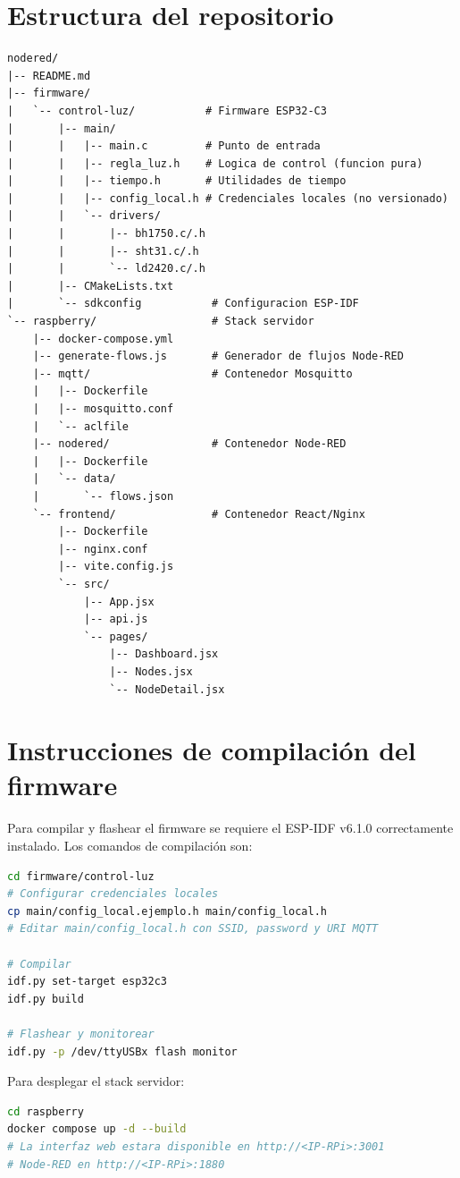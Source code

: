 \section{Estructura del repositorio}
\label{anx:estructura}

\begin{lstlisting}[caption={Estructura de directorios del proyecto NodeAlert IoT.}, label={lst:estructura}]
nodered/
|-- README.md
|-- firmware/
|   `-- control-luz/           # Firmware ESP32-C3
|       |-- main/
|       |   |-- main.c         # Punto de entrada
|       |   |-- regla_luz.h    # Logica de control (funcion pura)
|       |   |-- tiempo.h       # Utilidades de tiempo
|       |   |-- config_local.h # Credenciales locales (no versionado)
|       |   `-- drivers/
|       |       |-- bh1750.c/.h
|       |       |-- sht31.c/.h
|       |       `-- ld2420.c/.h
|       |-- CMakeLists.txt
|       `-- sdkconfig           # Configuracion ESP-IDF
`-- raspberry/                  # Stack servidor
    |-- docker-compose.yml
    |-- generate-flows.js       # Generador de flujos Node-RED
    |-- mqtt/                   # Contenedor Mosquitto
    |   |-- Dockerfile
    |   |-- mosquitto.conf
    |   `-- aclfile
    |-- nodered/                # Contenedor Node-RED
    |   |-- Dockerfile
    |   `-- data/
    |       `-- flows.json
    `-- frontend/               # Contenedor React/Nginx
        |-- Dockerfile
        |-- nginx.conf
        |-- vite.config.js
        `-- src/
            |-- App.jsx
            |-- api.js
            `-- pages/
                |-- Dashboard.jsx
                |-- Nodes.jsx
                `-- NodeDetail.jsx
\end{lstlisting}

\section{Instrucciones de compilación del firmware}
\label{anx:compilacion}

Para compilar y flashear el firmware se requiere el ESP-IDF v6.1.0 correctamente
instalado. Los comandos de compilación son:

\begin{lstlisting}[language=bash, caption={Comandos de compilación y flasheo del firmware.}, label={lst:build}]
cd firmware/control-luz
# Configurar credenciales locales
cp main/config_local.ejemplo.h main/config_local.h
# Editar main/config_local.h con SSID, password y URI MQTT

# Compilar
idf.py set-target esp32c3
idf.py build

# Flashear y monitorear
idf.py -p /dev/ttyUSBx flash monitor
\end{lstlisting}

Para desplegar el stack servidor:

\begin{lstlisting}[language=bash, caption={Despliegue del stack servidor en Raspberry Pi.}, label={lst:deploy}]
cd raspberry
docker compose up -d --build
# La interfaz web estara disponible en http://<IP-RPi>:3001
# Node-RED en http://<IP-RPi>:1880
\end{lstlisting}

